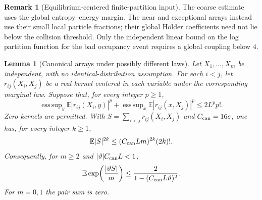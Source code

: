 \documentclass[11pt,reqno]{amsart}
\numberwithin{equation}{section}
\theoremstyle{plain}
\newtheorem{lemma}[lemma]{Lemma}
\theoremstyle{definition}
\newtheorem{remark}[remark]{Remark}
\newcommand{\E}{\mathbb E}
\begin{document}
\begin{remark}[Equilibrium-centered finite-partition input]\label{pcsp:rem:partition-dependency}
The coarse estimate uses the global entropy--energy margin. The near and exceptional arrays instead use their small local particle fractions; their global H\"older coefficients need not lie below the collision threshold. Only the independent linear bound on the log partition function for the bad occupancy event requires a global coupling below $4$.
\end{remark}

\begin{lemma}[Canonical arrays under possibly different laws]\label{pcsp:lem:canonical-array-nonidentical}
Let $X_1,\ldots,X_m$ be independent, with no identical-distribution
assumption.  For each $i<j$, let $r_{ij}(X_i,X_j)$ be a real kernel
centered in each variable under the corresponding marginal law.  Suppose
that, for every integer $p\geq1$,
\begin{equation}
 \mathop{\mathrm{ess\,sup}}_y\E|r_{ij}(X_i,y)|^p
 +\mathop{\mathrm{ess\,sup}}_x\E|r_{ij}(x,X_j)|^p
 \leq 2L^p p!.
\end{equation}
Zero kernels are permitted.  With $S=\sum_{i<j}r_{ij}(X_i,X_j)$ and
$C_{\rm can}=16e$, one has, for every integer $k\geq1$,
\begin{equation}
 \E|S|^{2k}\leq (C_{\rm can}Lm)^{2k}(2k)!.
\end{equation}
Consequently, for $m\geq2$ and $|\vartheta|C_{\rm can}L<1$,
\begin{equation}
 \E\exp\!\left(\frac{|\vartheta S|}{m}\right)
 \leq \frac{2}{1-(C_{\rm can}L\vartheta)^2}.
\end{equation}
For $m=0,1$ the pair sum is zero.
\end{lemma}
\end{document}
